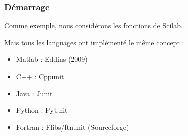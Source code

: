 \documentclass{beamer}
\begin{document}
\begin{frame}[containsverbatim]
\frametitle{Démarrage}

Comme exemple, nous considérons les fonctions  de Scilab. 

Mais tous les languages ont implémenté le même concept :
\begin{itemize}
\item Matlab : Eddins (2009)
\item C++ : Cppunit
\item Java : Junit
\item Python : PyUnit
\item Fortran : Flibs/ftnunit (Sourceforge)
\end{itemize}

\end{frame}




\end{document}
